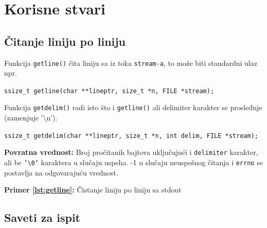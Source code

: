 \documentclass[a4paper, 11pt, twoside]{article}
\newcommand{\scode}[3] {
	\hspace{.06\textwidth} 
	\begin{minipage}[t]{.88\textwidth} %
		\begin{mdframed}[topline=true,bottomline=true,leftline=true,rightline=true,backgroundcolor=gray!22, linecolor=gray!60!black,roundcorner=1mm]
			 

	\begin{center}
		\caption{\textbf{Primer \ref{lst:#3}:} #2}
	\end{center}
	\end{mdframed}
	\end{minipage}

}
\begin{document}
\newpage

\section{Korisne stvari}

\subsection{Čitanje liniju po liniju}

Funkcija \texttt{getline()} čita liniju sa iz toka \texttt{stream-a}, to može biti standardni ulaz npr.
\begin{center}
	\texttt{ssize\_t getline(char **lineptr, size\_t *n, FILE *stream);}
\end{center}

Funkcija \texttt{getdelim()} radi isto što i \texttt{getline()} ali delimiter karakter se prosleđuje (zamenjuje '\textbackslash n').

\begin{center}
	\texttt{ssize\_t getdelim(char **lineptr, size\_t *n, int delim, FILE *stream);}
\end{center}

\textbf{Povratna vrednost:} Broj pročitanih bajtova uključujući i \texttt{delimiter} karakter, ali be \texttt{'\textbackslash 0'} karaktera u slučaju uspeha. -1 u slučaju neuspešnog čitanja i \texttt{errno} se postavlja na odgovarajuću vrednost.

\scode{getline.c}{Čistanje liniju po liniju sa stdout}{getline}


\subsection{Saveti za ispit}
\end{document}
